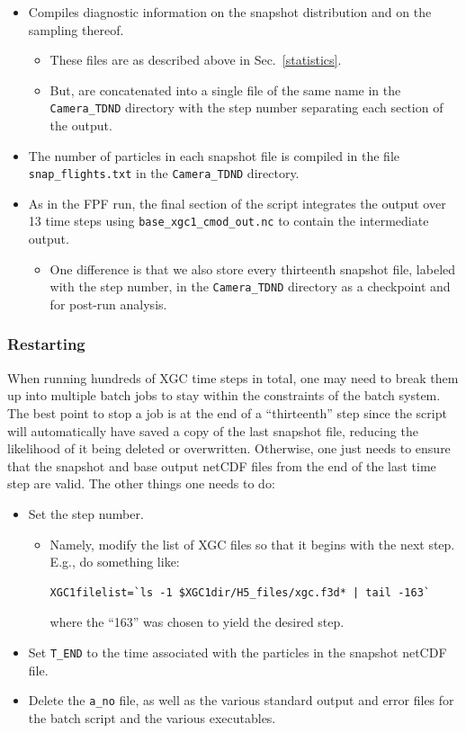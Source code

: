 \documentclass[12pt]{report}
\begin{document}
\begin{itemize}
\item Compiles diagnostic information on the snapshot
  distribution and on the sampling thereof.
  \begin{itemize}
  \item These files are as described above in Sec.~\ref{statistics}.
  \item But, are concatenated into a single file of the same
    name in the {\tt Camera\_TDND} directory with the step number
    separating each section of the output.
  \end{itemize}
\item The number of particles in each snapshot file is compiled
  in the file {\tt snap\_flights.txt} in the
  {\tt Camera\_TDND} directory.
\item As in the FPF run, the final section of the script integrates
  the output over 13 time steps using {\tt base\_xgc1\_cmod\_out.nc}
  to contain the intermediate output.
  \begin{itemize}
  \item One difference is that we also store every thirteenth snapshot
    file, labeled with the step number, in the {\tt Camera\_TDND}
    directory as a checkpoint and for post-run analysis.
    \end{itemize}
\end{itemize}

\subsubsection{Restarting}

When running hundreds of XGC time steps in total, one may need to
break them up into multiple batch jobs to stay within the
constraints of the batch system.  The best point to stop a
job is at the end of a ``thirteenth'' step since the script
will automatically have saved a copy of
the last snapshot file, reducing
the likelihood of it being deleted or overwritten.  Otherwise,
one just needs to ensure that the snapshot and base output
netCDF files from the end of the last time step are valid.
The other things one needs to do:
\begin{itemize}
\item Set the step number.
  \begin{itemize}
  \item Namely, modify the list of XGC files
    so that it begins with the next step.  E.g., do something
    like:
\begin{verbatim}
XGC1filelist=`ls -1 $XGC1dir/H5_files/xgc.f3d* | tail -163`
\end{verbatim}
    where the ``163'' was chosen to yield the desired step.
  \end{itemize}
\item Set \verb+T_END+ to the time associated with the particles
  in the snapshot netCDF file.
\item Delete the \verb+a_no+ file, as well as the various
  standard output and error files for the batch script and
  the various executables.
\end{itemize}
\end{document}
